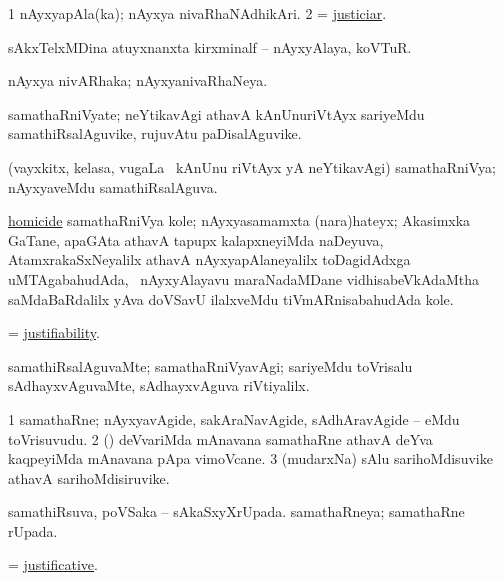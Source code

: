 \bentry
{}
\gl{\nA}
\bmng
\bnum
\num{1} nAyxyapAla(ka); nAyxya nivaRhaNAdhikAri. 
\num{2}  = \hyperlink{justiciar}{justiciar}. 
\enum
\emng

\noindent
\gl{\pagu}
\bmng
{} sAkxTelxMDina atuyxnanxta kirxminalf -- nAyxyAlaya, koVTuR. 
\emng
\eentry

\bentry
{}
\gl{\gu}
\bmng
nAyxya nivARhaka; nAyxyanivaRhaNeya. 
\emng
\eentry

\bentry
{}
\gl{\nA}
\bmng
samathaRniVyate; neYtikavAgi athavA kAnUnuriVtAyx sariyeMdu samathiRsalAguvike, rujuvAtu paDisalAguvike. 
\emng
\eentry

\bentry
{}
\gl{\gu}
\bmng
(vayxkitx, kelasa, \mo vugaLa \vi\ kAnUnu riVtAyx yA neYtikavAgi) samathaRniVya; nAyxyaveMdu samathiRsalAguva. 
\emng

\noindent
\gl{\pagu}
\bmng
{} \hyperref{kandict_h.pdf}{H}{homicide pagu(2)}{homicide} samathaRniVya kole; nAyxyasamamxta (nara)hateyx; Akasimxka GaTane, apaGAta athavA tapupx kalapxneyiMda naDeyuva, AtamxrakaSxNeyalilx athavA nAyxyapAlaneyalilx toDagidAdxga uMTAgabahudAda, \kanmu\ nAyxyAlayavu maraNadaMDane vidhisabeVkAdaMtha saMdaBaRdalilx yAva doVSavU ilalxveMdu tiVmARnisabahudAda kole. 
\emng
\eentry

\bentry
{}
\gl{\nA}
\bmng
= \hyperlink{justifiability}{justifiability}. 
\emng
\eentry

\bentry
{}
\gl{\kirxvi}
\bmng
samathiRsalAguvaMte; samathaRniVyavAgi; sariyeMdu toVrisalu sAdhayxvAguvaMte, sAdhayxvAguva riVtiyalilx. 
\emng
\eentry

\bentry
{}
\gl{\nA}
\bmng
\bnum
\num{1} samathaRne; nAyxyavAgide, sakAraNavAgide, sAdhAravAgide -- eMdu toVrisuvudu. 
\num{2} (\deVva) deVvariMda mAnavana samathaRne athavA deYva kaqpeyiMda mAnavana pApa vimoVcane. 
\num{3} (mudarxNa) sAlu sarihoMdisuvike athavA sarihoMdisiruvike. 
\enum
\emng
\eentry

\bentry
{}
\gl{\gu}
\bmng
\banum
{} samathiRsuva, poVSaka -- sAkaSxyXrUpada. 
 samathaRneya; samathaRne rUpada. 
\eanum
\emng
\eentry

\bentry
{}
\gl{\gu}
\bmng
 = \hyperlink{justificative}{justificative}. 
\emng
\eentry

